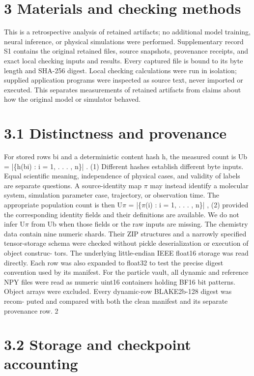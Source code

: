 \documentclass[11pt]{article}
\begin{document}
\section*{3 Materials and checking methods}

This is a retrospective analysis of retained artifacts; no additional model training, neural inference,
or physical simulations were performed. Supplementary record S1 contains the original retained
files, source snapshots, provenance receipts, and exact local checking inputs and results. Every
captured file is bound to its byte length and SHA-256 digest. Local checking calculations were
run in isolation; supplied application programs were inspected as source text, never imported or
executed. This separates measurements of retained artifacts from claims about how the original
model or simulator behaved.

\section*{3.1 Distinctness and provenance}

For stored rows bi and a deterministic content hash h, the measured count is
Ub = |\{h(bi) : i = 1, . . . , n\}| . (1)
Different hashes establish different byte inputs. Equal scientific meaning, independence of physical
cases, and validity of labels are separate questions. A source-identity map \ensuremath{\pi} may instead identify
a molecular system, simulation parameter case, trajectory, or observation time. The appropriate
population count is then
U\ensuremath{\pi} = |\{\ensuremath{\pi}(i) : i = 1, . . . , n\}| , (2)
provided the corresponding identity fields and their definitions are available. We do not infer U\ensuremath{\pi}
from Ub when those fields or the raw inputs are missing.
The chemistry data contain nine numeric shards. Their ZIP structures and a narrowly specified
tensor-storage schema were checked without pickle deserialization or execution of object construc-
tors. The underlying little-endian IEEE float16 storage was read directly. Each row was also
expanded to float32 to test the precise digest convention used by its manifest. For the particle
vault, all dynamic and reference NPY files were read as numeric uint16 containers holding BF16
bit patterns. Object arrays were excluded. Every dynamic-row BLAKE2b-128 digest was recom-
puted and compared with both the clean manifest and its separate provenance row.
2


\section*{3.2 Storage and checkpoint accounting}
\end{document}
